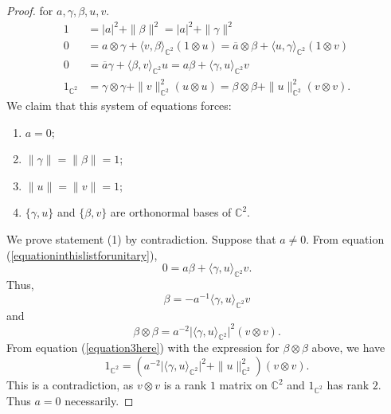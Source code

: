\documentclass[12pt,reqno]{amsart}
\numberwithin{equation}{section}
\theoremstyle{definition}
\begin{document}
\begin{proof}
for $a, \gamma, \beta, u, v$.
\begin{align}
    1 &= \lvert a \rvert^{2}+\|\beta\|^{2} = \lvert a \rvert^{2}+\|\gamma\|^{2} \label{equation1here}\\
    0 &= a\otimes \gamma+\langle v,\beta\rangle_{\mathbb{C}^{2}}(1\otimes u) = \overline{a}\otimes\beta+\langle u,\gamma\rangle_{\mathbb{C}^{2}}(1\otimes v) \label{equation2here}\\
    0 &=\overline{a}\gamma+\langle\beta,v\rangle_{\mathbb{C}^{2}}u = a\beta + \langle \gamma,u \rangle_{\mathbb{C}^{2}} v \label{equationinthislistforunitary}\\
    1_{\mathbb{C}^{2}} &= \gamma\otimes\gamma + \|v\|_{\mathbb{C}^{2}}^{2}(u\otimes u) = \beta\otimes\beta + \|u\|_{\mathbb{C}^{2}}^{2}(v\otimes v).\label{equation3here}
\end{align}
We claim that this system of equations forces: 
\begin{enumerate}
    \item $a=0$;
    \item $\|\gamma\|=\|\beta\|=1$;
    \item $\|u\|=\|v\|=1$;
    \item $\{\gamma,u\}$ and $\{\beta,v\}$ are orthonormal bases of $\mathbb{C}^{2}$.
\end{enumerate}
We prove statement (1) by contradiction. Suppose that $a\neq 0$. From equation (\ref{equationinthislistforunitary}), 
$$0=a\beta+\langle \gamma, u\rangle_{\mathbb{C}^{2}}v.$$
Thus,
$$\beta=-a^{-1}\langle \gamma,u\rangle_{\mathbb{C}^{2}}v$$
and 
$$\beta\otimes\beta = a^{-2}\lvert \langle \gamma,u\rangle_{\mathbb{C}^{2}}\rvert^{2}(v\otimes v).$$
From equation (\ref{equation3here}) with the expression for $\beta\otimes\beta$ above, we have 
$$1_{\mathbb{C}^{2}} = (a^{-2}\lvert \langle \gamma,u\rangle_{\mathbb{C}^{2}}\rvert^{2}+\|u\|_{\mathbb{C}^{2}}^{2})(v\otimes v).$$
This is a contradiction, as $v\otimes v$ is a rank $1$ matrix on $\mathbb{C}^{2}$ and $1_{\mathbb{C}^{2}}$ has rank $2$. Thus $a=0$ necessarily.


\end{proof}
\end{document}
